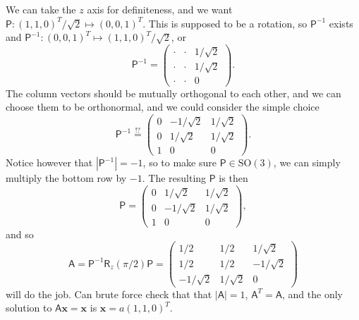 \documentclass[letter-paper]{tufte-book}
\newenvironment{example}[1][Example]{\begin{trivlist}
\item[\hskip \labelsep {\bfseries #1}]}{\end{trivlist}}
\newcommand{\As}{{\mathsf{A}}}
\newcommand{\Ps}{{\mathsf{P}}}
\newcommand{\xb}{{\boldsymbol{x}}}
\begin{document}
\begin{example}
  We can take the $z$ axis for definiteness, and we want $\Ps:
  (1,1,0)^T/\sqrt{2} \mapsto (0,0,1)^T$. This is supposed to be a rotation, so
  $\Ps^{-1}$ exists and $\Ps^{-1}:(0,0,1)^T \mapsto (1,1,0)^T/\sqrt{2}$, or
  \begin{equation*}
    \Ps^{-1} = \begin{pmatrix}\cdot & \cdot & 1/\sqrt{2} \\ \cdot & \cdot & 1/\sqrt{2} \\ \cdot & \cdot & 0\end{pmatrix}.
  \end{equation*}
  The column vectors should be mutually orthogonal to each other, and we can
  choose them to be orthonormal, and we could consider the simple choice
  \begin{equation*}
    \Ps^{-1} \stackrel{!?}{=} \begin{pmatrix}0 & -1/\sqrt{2} & 1/\sqrt{2} \\ 0 & 1/\sqrt{2} & 1/\sqrt{2} \\ 1 & 0 & 0\end{pmatrix}.
  \end{equation*}
  Notice however that $|\Ps^{-1}|=-1$, so to make sure $\Ps\in\mbox{SO}(3)$, we
  can simply multiply the bottom row by $-1$. The resulting $\Ps$ is then
  \begin{equation*}
    \Ps = \begin{pmatrix}0 & 1/\sqrt{2} & 1/\sqrt{2} \\ 0 & -1/\sqrt{2} & 1/\sqrt{2} \\ 1 & 0 & 0\end{pmatrix},
  \end{equation*}
  and so
  \begin{equation*}
    \As = \Ps^{-1} \mathsf{R}_z(\pi/2) \Ps = \begin{pmatrix}1/2 & 1/2 & 1/\sqrt{2} \\ 1/2 & 1/2 & -1/\sqrt{2} \\ -1/\sqrt{2} & 1/\sqrt{2} & 0\end{pmatrix}
  \end{equation*}
  will do the job. Can brute force check that that $|\As|=1$, $\As^T = \As$, and
  the only solution to $\As\xb = \xb$ is $\xb = a(1, 1, 0)^T$.
\end{example}

\end{document}
